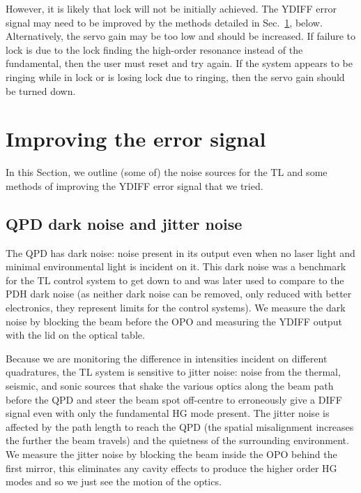 \documentclass[aps,pra,superscriptaddress,reprint,nofootinbib]{revtex4-1}
\begin{document}
However, it is likely that lock will not be initially achieved. The YDIFF error signal may need to be improved by the methods detailed in Sec.~\ref{sec:error_signal}, below. Alternatively, the servo gain may be too low and should be increased. If failure to lock is due to the lock finding the high-order resonance instead of the fundamental, then the user must reset and try again. If the system appears to be ringing while in lock or is losing lock due to ringing, then the servo gain should be turned down.


\section{Improving the error signal}
\label{sec:error_signal}

In this Section, we outline (some of) the noise sources for the TL and some methods of improving the YDIFF error signal that we tried.

\subsection{QPD dark noise and jitter noise}

The QPD has dark noise: noise present in its output even when no laser light and minimal environmental light is incident on it. This dark noise was a benchmark for the TL control system to get down to and was later used to compare to the PDH dark noise (as neither dark noise can be removed, only reduced with better electronics, they represent limits for the control systems). We measure the dark noise by blocking the beam before the OPO and measuring the YDIFF output with the lid on the optical table.

Because we are monitoring the difference in intensities incident on different quadratures, the TL system is sensitive to jitter noise: noise from the thermal, seismic, and sonic sources that shake the various optics along the beam path before the QPD and steer the beam spot off-centre to erroneously give a DIFF signal even with only the fundamental HG mode present. The jitter noise is affected by the path length to reach the QPD (the spatial misalignment increases the further the beam travels) and the quietness of the surrounding environment. We measure the jitter noise by blocking the beam inside the OPO behind the first mirror, this eliminates any cavity effects to produce the higher order HG modes and so we just see the motion of the optics.
\end{document}
